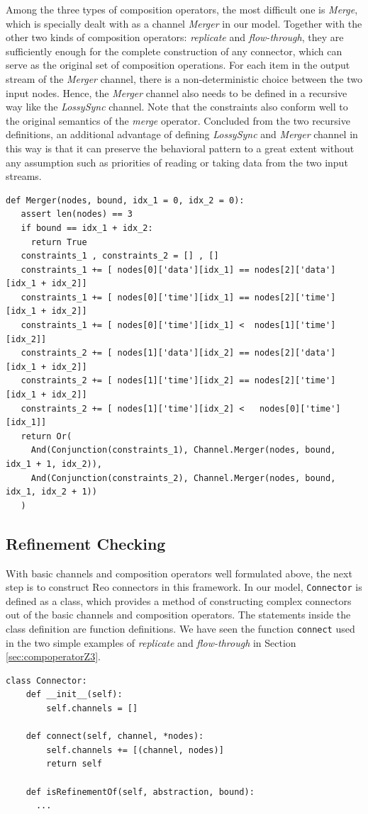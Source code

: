 \documentclass[preprint,3p]{elsarticle}
\begin{document}
Among the three types of composition operators, the most difficult one is \emph{Merge}, which is specially dealt with as a channel \emph{Merger} in our model. Together with the other two kinds of composition operators: \emph{replicate} and \emph{flow-through}, they are sufficiently enough for the complete construction of any connector, which can serve as the original set of composition operations. For each item in the output stream of the \emph{Merger} channel, there is a non-deterministic choice between the two input nodes. Hence, the \emph{Merger} channel also needs to be defined in a recursive way like the \emph{LossySync} channel. Note that the constraints also conform well to the original semantics of the \emph{merge} operator. Concluded from the two recursive definitions, an additional advantage of defining \emph{LossySync} and \emph{Merger} channel in this way is that it can preserve the behavioral pattern to a great extent without any assumption such as priorities of reading or taking data from the two input streams.
\begin{lstlisting}
def Merger(nodes, bound, idx_1 = 0, idx_2 = 0):
   assert len(nodes) == 3
   if bound == idx_1 + idx_2:
     return True
   constraints_1 , constraints_2 = [] , []
   constraints_1 += [ nodes[0]['data'][idx_1] == nodes[2]['data'][idx_1 + idx_2]]
   constraints_1 += [ nodes[0]['time'][idx_1] == nodes[2]['time'][idx_1 + idx_2]]
   constraints_1 += [ nodes[0]['time'][idx_1] <  nodes[1]['time'][idx_2]]
   constraints_2 += [ nodes[1]['data'][idx_2] == nodes[2]['data'][idx_1 + idx_2]]
   constraints_2 += [ nodes[1]['time'][idx_2] == nodes[2]['time'][idx_1 + idx_2]]
   constraints_2 += [ nodes[1]['time'][idx_2] <   nodes[0]['time'][idx_1]]
   return Or(
     And(Conjunction(constraints_1), Channel.Merger(nodes, bound, idx_1 + 1, idx_2)),
     And(Conjunction(constraints_2), Channel.Merger(nodes, bound, idx_1, idx_2 + 1))
   )
\end{lstlisting}

\subsection{Refinement Checking}
With basic channels and composition operators well formulated above, the next step is to construct Reo connectors in this framework. In our model, \texttt{Connector} is defined as a class, which provides a method of constructing complex connectors out of the basic channels and composition operators.
The statements inside the class definition are function definitions. We have seen the function \texttt{connect} used in the two simple examples of \emph{replicate} and \emph{flow-through} in Section \ref{sec:compoperatorZ3}.
\begin{lstlisting}
class Connector:
    def __init__(self):
        self.channels = []

    def connect(self, channel, *nodes):
        self.channels += [(channel, nodes)]
        return self

    def isRefinementOf(self, abstraction, bound):
      ...
\end{lstlisting}
\end{document}
